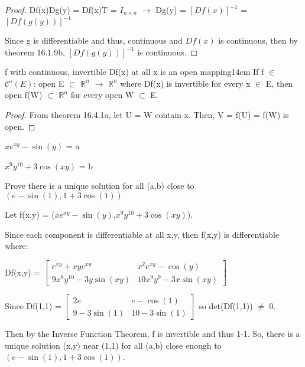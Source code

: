 \begin{proof}
        \hspace{0.5cm}
        Df(x)Dg(y) = Df(x)T = $I_{n \times n}$
        \hspace{0.5cm}
        $\rightarrow$
        \hspace{0.5cm}
        Dg(y) = $[Df(x)]^{-1}$
        = $[Df(g(y))]^{-1}$

        Since g is differentiable and thus, continuous and $Df(x)$
        is continuous, then by {\color{red} theorem 16.1.9b},
        $[Df(g(y))]^{-1}$ is continuous.
    \end{proof}

    \vspace{0.5cm}



    \begin{corollary}{f with continuous, invertible Df(x) at all x is
    an open mapping}{14cm}
        If f $\in$ $\mathscr{C}'(E)$: open E $\subset$ $\mathbb{R}^n$
        $\rightarrow$ $\mathbb{R}^n$ where Df(x) is invertible for every x
        $\in$ E, then open f(W) $\subset$ $\mathbb{R}^n$ for
        every open W $\subset$ E.
    \end{corollary}

    \begin{proof}
        From {\color{red} theorem 16.4.1a}, let U = W contain x.
        Then, V = f(U) = f(W) is open.
    \end{proof}

    \newpage



    \begin{example}
        $xe^{xy} - \sin(y)$ = a

        $x^9 y^{10} + 3\cos(xy)$ = b

        Prove there is a unique solution for all (a,b)
        close to $(e-\sin(1),1+3\cos(1))$
    \end{example}

    \begin{tbox}
        Let f(x,y) = ($xe^{xy} - \sin(y)$,$x^9 y^{10} + 3\cos(xy)$).

        Since each component is differentiable at all x,y, then
        f(x,y) is differentiable where:

        \hspace{0.5cm}
        Df(x,y) =
        $\begin{bmatrix}
            e^{xy} + xye^{xy} & x^2e^{xy} - \cos(y) \\
            9x^8y^{10} - 3y\sin(xy) & 10x^9y^9 - 3x \sin(xy)
        \end{bmatrix}$

        Since Df(1,1) =
        $\begin{bmatrix}
            2e & e - \cos(1) \\
            9 - 3\sin(1) & 10 - 3\sin(1)
        \end{bmatrix}$
        so det(Df(1,1)) $\not =$ 0.

        Then by the Inverse Function Theorem, f is invertible
        and thus 1-1. So, there is a unique solution (x,y)
        near (1,1) for all (a,b)
        close enough to $(e-\sin(1),1+3\cos(1))$.
    \end{tbox}

